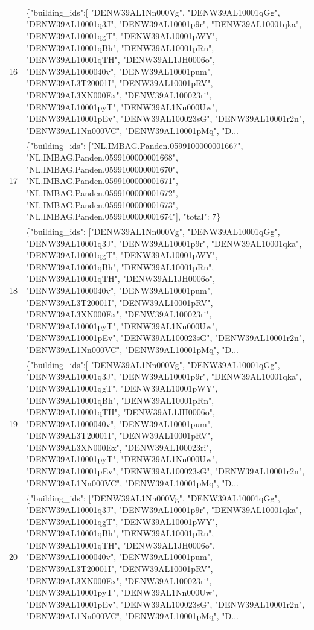 \documentclass[a4paper,11pt]{article}
\begin{document}
\begin{table}[ht]
\begin{tabular}{r p{12cm}}
16 & \{"building\_ids":[ "DENW39AL1Nn000Vg", "DENW39AL10001qGg", "DENW39AL10001q3J", "DENW39AL10001p9r", "DENW39AL10001qka", "DENW39AL10001qgT", "DENW39AL10001pWY", "DENW39AL10001qBh", "DENW39AL10001pRn", "DENW39AL10001qTH", "DENW39AL1JH0006o", "DENW39AL1000040v", "DENW39AL10001pum", "DENW39AL3T20001I", "DENW39AL10001pRV", "DENW39AL3XN000Ex", "DENW39AL100023ri", "DENW39AL10001pyT", "DENW39AL1Nn000Uw", "DENW39AL10001pEv", "DENW39AL100023sG", "DENW39AL10001r2n", "DENW39AL1Nn000VC", "DENW39AL10001pMq", "D... \\
17 & \{"building\_ids": ["NL.IMBAG.Panden.0599100000001667", "NL.IMBAG.Panden.0599100000001668", "NL.IMBAG.Panden.0599100000001670", "NL.IMBAG.Panden.0599100000001671", "NL.IMBAG.Panden.0599100000001672", "NL.IMBAG.Panden.0599100000001673", "NL.IMBAG.Panden.0599100000001674"], "total": 7\} \\
18 & \{"building\_ids": ["DENW39AL1Nn000Vg", "DENW39AL10001qGg", "DENW39AL10001q3J", "DENW39AL10001p9r", "DENW39AL10001qka", "DENW39AL10001qgT", "DENW39AL10001pWY", "DENW39AL10001qBh", "DENW39AL10001pRn", "DENW39AL10001qTH", "DENW39AL1JH0006o", "DENW39AL1000040v", "DENW39AL10001pum", "DENW39AL3T20001I", "DENW39AL10001pRV", "DENW39AL3XN000Ex", "DENW39AL100023ri", "DENW39AL10001pyT", "DENW39AL1Nn000Uw", "DENW39AL10001pEv", "DENW39AL100023sG", "DENW39AL10001r2n", "DENW39AL1Nn000VC", "DENW39AL10001pMq", "D... \\
19 & \{"building\_ids":[ "DENW39AL1Nn000Vg", "DENW39AL10001qGg", "DENW39AL10001q3J", "DENW39AL10001p9r", "DENW39AL10001qka", "DENW39AL10001qgT", "DENW39AL10001pWY", "DENW39AL10001qBh", "DENW39AL10001pRn", "DENW39AL10001qTH", "DENW39AL1JH0006o", "DENW39AL1000040v", "DENW39AL10001pum", "DENW39AL3T20001I", "DENW39AL10001pRV", "DENW39AL3XN000Ex", "DENW39AL100023ri", "DENW39AL10001pyT", "DENW39AL1Nn000Uw", "DENW39AL10001pEv", "DENW39AL100023sG", "DENW39AL10001r2n", "DENW39AL1Nn000VC", "DENW39AL10001pMq", "D... \\
20 & \{"building\_ids": ["DENW39AL1Nn000Vg", "DENW39AL10001qGg", "DENW39AL10001q3J", "DENW39AL10001p9r", "DENW39AL10001qka", "DENW39AL10001qgT", "DENW39AL10001pWY", "DENW39AL10001qBh", "DENW39AL10001pRn", "DENW39AL10001qTH", "DENW39AL1JH0006o", "DENW39AL1000040v", "DENW39AL10001pum", "DENW39AL3T20001I", "DENW39AL10001pRV", "DENW39AL3XN000Ex", "DENW39AL100023ri", "DENW39AL10001pyT", "DENW39AL1Nn000Uw", "DENW39AL10001pEv", "DENW39AL100023sG", "DENW39AL10001r2n", "DENW39AL1Nn000VC", "DENW39AL10001pMq", "D... \\
\hline
\end{tabular}
\end{table}
\end{document}
